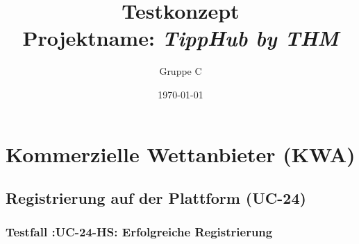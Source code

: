 \documentclass[a4paper,12pt]{article}
\title{Testkonzept\\[1ex]\large{Projektname: \textit{TippHub by THM}}}
\author{Gruppe C}
\date{\today}
\begin{document}
\maketitle
\tableofcontents
\newpage

\section{Kommerzielle Wettanbieter (KWA)}

\subsection{Registrierung auf der Plattform (UC-24)}

\subsubsection{Testfall :UC-24-HS: Erfolgreiche Registrierung}
\end{document}
